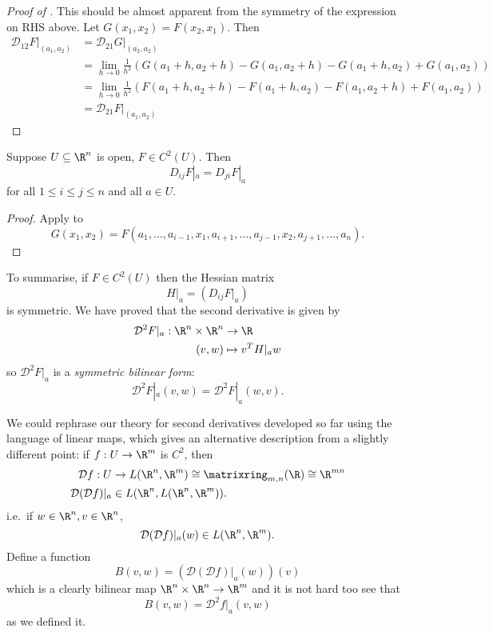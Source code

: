 \documentclass[a4paper]{article}
\newcommand*{\D}{\mathcal{D}}
\theoremstyle{definition}
\begin{document}
\begin{proof}[Proof of ]
  This should be almost apparent from the symmetry of the expression on RHS above. Let \(G(x_1, x_2) = F(x_2, x_1)\). Then
  \begin{align*}
    \D_{12} F|_{(a_1, a_2)} &= \D_{21} G|_{(a_2, a_2)} \\
                            &= \lim_{h \to 0} \frac{1}{h^2} \left( G(a_1 + h, a_2 + h) - G(a_1, a_2 + h) - G(a_1 + h, a_2) + G(a_1, a_2) \right) \\
                            &= \lim_{h \to 0} \frac{1}{h^2} \left( F(a_1 + h, a_2 + h) - F(a_1 + h, a_2) - F(a_1, a_2 + h) + F(a_1, a_2) \right) \\
                            &= \D_{21} F|_{(a_1, a_2)}
 \end{align*}
\end{proof}

\begin{corollary}
  Suppose \(U \subseteq \R^n\) is open, \(F \in C^2(U)\). Then
  \[
    D_{ij} F|_a = D_{ji} F|_a
  \]
  for all \(1 \leq i \leq j \leq n\) and all \(a \in U\).
\end{corollary}

\begin{proof}
  Apply  to
  \[
    G(x_1, x_2) = F(a_1, \dots, a_{i - 1}, x_1, a_{i + 1}, \dots, a_{j - 1}, x_2, a_{j + 1}, \dots, a_n).
  \]
\end{proof}

To summarise, if \(F \in C^2(U)\) then the Hessian matrix
\[
  H|_a = \left( D_{ij} F|_a \right)
\]
is symmetric. We have proved that the second derivative is given by
\begin{align*}
  \D^2 F|_a: \R^n \times \R^n &\to \R \\
  (v, w) &\mapsto v^T H|_a w
\end{align*}
so \(\D^2 F|_a\) is a \emph{symmetric bilinear form}:
\[
  \D^2 F|_a(v, w) = \D^2 F|_a(w, v).
\]

We could rephrase our theory for second derivatives developed so far using the language of linear maps, which gives an alternative description from a slightly different point: if \(f: U \to \R^m\) is \(C^2\), then
\begin{align*}
  \D f: U &\to L(\R^n, \R^m) \cong \matrixring_{m, n}(\R) \cong \R^{mn} \\
  \D (\D f)|_a &\in L(\R^n, L(\R^n, \R^m)).
\end{align*}
i.e.\ if \(w \in \R^n, v \in \R^n\),
\[
  \D (\D f)|_a (w) \in L(\R^n, \R^m).
\]
Define a function
\[
  B(v, w) = (\D( \D f)|_a (w))(v)
\]
which is a clearly bilinear map \(\R^n \times \R^n \to \R^m\) and it is not hard too see that
\[
  B(v, w) = \D^2 f|_a (v, w)
\]
as we defined it.
\end{document}

